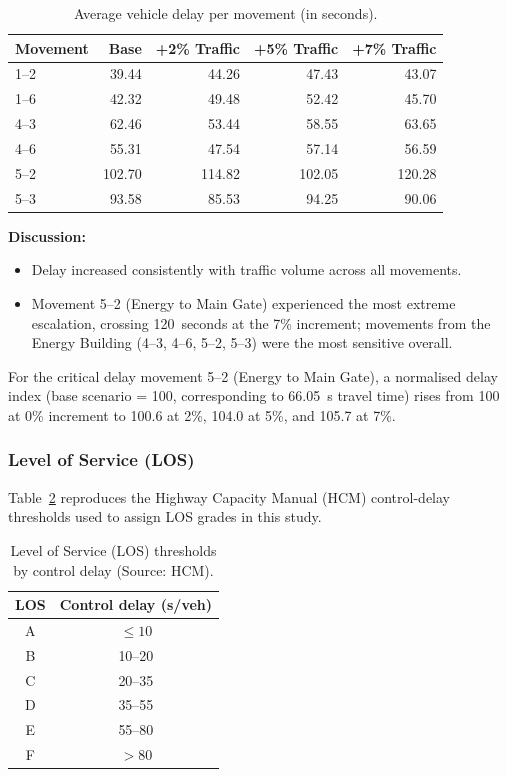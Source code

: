 \documentclass[11pt]{article}
\begin{document}
\begin{table}[H]
  \centering
  \small
  \caption{Average vehicle delay per movement (in seconds).}
  \label{tab:delay1}
  \begin{tabular}{@{}lrrrr@{}}
    \toprule
    \textbf{Movement} & \textbf{Base} & \textbf{+2\% Traffic} & \textbf{+5\% Traffic} & \textbf{+7\% Traffic} \\
    \midrule
    1--2 & 39.44 & 44.26 & 47.43  & 43.07 \\
    1--6 & 42.32 & 49.48 & 52.42  & 45.70 \\
    4--3 & 62.46 & 53.44 & 58.55  & 63.65 \\
    4--6 & 55.31 & 47.54 & 57.14  & 56.59 \\
    5--2 & 102.70 & 114.82 & 102.05 & 120.28 \\
    5--3 & 93.58 & 85.53 & 94.25  & 90.06 \\
    \bottomrule
  \end{tabular}
\end{table}

\textbf{Discussion:}
\begin{itemize}
  \item Delay increased consistently with traffic volume across all movements.
  \item Movement 5--2 (Energy to Main Gate) experienced the most extreme escalation, crossing
  120~seconds at the 7\% increment; movements from the Energy Building (4--3, 4--6, 5--2, 5--3) were the
  most sensitive overall.
\end{itemize}
For the critical delay movement 5--2 (Energy to Main Gate), a normalised delay index (base scenario =
100, corresponding to 66.05~s travel time) rises from 100 at 0\% increment to 100.6 at 2\%, 104.0 at 5\%,
and 105.7 at 7\%.

\subsubsection{Level of Service (LOS)}
Table~\ref{tab:losdef} reproduces the Highway Capacity Manual (HCM) control-delay thresholds used to
assign LOS grades in this study.

\begin{table}[H]
  \centering
  \small
  \caption{Level of Service (LOS) thresholds by control delay (Source: HCM).}
  \label{tab:losdef}
  \begin{tabular}{@{}cc@{}}
    \toprule
    \textbf{LOS} & \textbf{Control delay (s/veh)} \\
    \midrule
    A & $\leq 10$ \\
    B & 10--20 \\
    C & 20--35 \\
    D & 35--55 \\
    E & 55--80 \\
    F & $>80$ \\
    \bottomrule
  \end{tabular}
\end{table}
\end{document}
